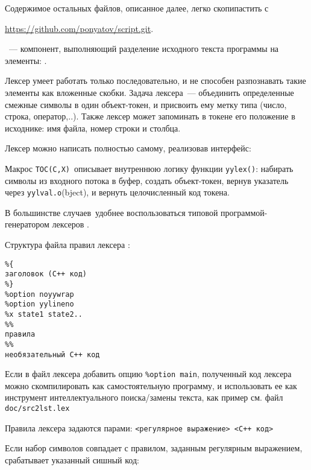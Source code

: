 
\bigskip
Содержимое остальных файлов, описанное далее, легко скопипастить с

\bigskip
\url{https://github.com/ponyatov/script.git}.

\secdown


\ --- компонент, выполняющий разделение исходного 
текста программы на элементы: .

\bigskip
Лексер умеет работать только последовательно, и не способен разпознавать такие
элементы как вложенные скобки. Задача лексера\ --- объединить определенные
смежные символы в один объект-токен, и присвоить ему метку типа (число, строка, 
оператор,..). Также лексер может запоминать в токене его положение в 
исходнике: имя файла, номер строки и столбца.

Лексер можно написать полностью самому, реализовав интерфейс:

Макрос \verb|TOC(C,X)|\ описывает внутреннюю логику функции \verb|yylex()|:
набирать символы из входного потока в буфер, создать объект-токен, вернув 
указатель через \verb|yylval.o|(bject), и вернуть целочисленный код токена.

\bigskip
В большинстве случаев\ удобнее воспользоваться типовой программой-генератором
лексеров .

Структура файла правил лексера :
\begin{verbatim}
%{
заголовок (С++ код)
%}
%option noyywrap
%option yylineno
%x state1 state2..
%%
правила
%%
необязательный С++ код
\end{verbatim}

Если в файл лексера добавить опцию \verb|%option main|, полученный код лексера
можно скомпилировать как самостоятельную программу, и использовать ее как
инструмент интеллектуального поиска/замены текста, как пример
см. файл \verb|doc/src2lst.lex|


Правила лексера задаются парами: \verb|<регулярное выражение> <C++ код>|

Если набор символов совпадает с правилом, заданным регулярным выражением,
срабатывает указанный сишный код:

